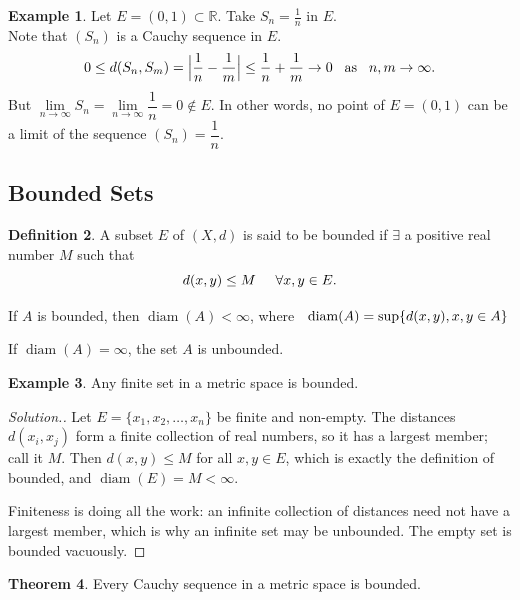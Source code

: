 \documentclass[11pt,a4paper]{article}
\theoremstyle{definition}
\newtheorem{thm}{Theorem}[section]
\newtheorem{defn}[thm]{Definition}
\newtheorem{exa}[thm]{Example}
\DeclareMathOperator{\diam}{diam}
\newenvironment{solution}
  {\renewcommand{\qedsymbol}{}\begin{proof}[\textit{Solution}.]}
  {\end{proof}}
\begin{document}
\begin{exa}
Let $E=(0,1)\subset \mathbb{R}$. Take $S_n=\frac{1}{n}$ in $E$.\\ Note that $(S_n)$ is a Cauchy sequence in $E$. $$0\leq d(S_n,S_m)=\Big|\frac{1}{n}-\frac{1}{m}\Big|\leq \dfrac{1}{n}+\frac{1}{m}\rightarrow 0\hspace{0.3cm}\text{as}\hspace{0.3cm} n,m\rightarrow \infty.$$ 
But $\lim\limits_{n\rightarrow \infty}S_n=\lim\limits_{n\rightarrow \infty}\dfrac{1}{n}=0\not\in E$. In other words, no point of $E=(0,1)$ can be a limit of the sequence $(S_n)=\dfrac{1}{n}$.
\end{exa}


\pagebreak

\subsection{Bounded Sets}

\begin{defn}
A subset $E$ of $(X,d)$ is said to be bounded if $\exists$ a positive real number $M$ such that $$d(x,y)\leq M\hspace{0.5cm} \forall x,y\in E.$$

If $A$ is bounded, then $\diam(A)<\infty$, where $\hspace{0.2cm}\diam(A)=\sup \{d(x,y), x,y\in A\}$


If $\diam(A)=\infty$, the set $A$ is unbounded.

\end{defn}


\begin{exa}
Any finite set in a metric space is bounded.

\end{exa}

\begin{solution}
Let $E=\{x_1,x_2,\dots,x_n\}$ be finite and non-empty. The distances
$d(x_i,x_j)$ form a finite collection of real numbers, so it has a largest
member; call it $M$. Then $d(x,y)\leq M$ for all $x,y\in E$, which is exactly
the definition of bounded, and $\diam(E)=M<\infty$.

Finiteness is doing all the work: an infinite collection of distances need not
have a largest member, which is why an infinite set may be unbounded. The empty
set is bounded vacuously.
\end{solution}


\begin{thm}
Every Cauchy sequence in a metric space is bounded.

\end{thm}
\end{document}
